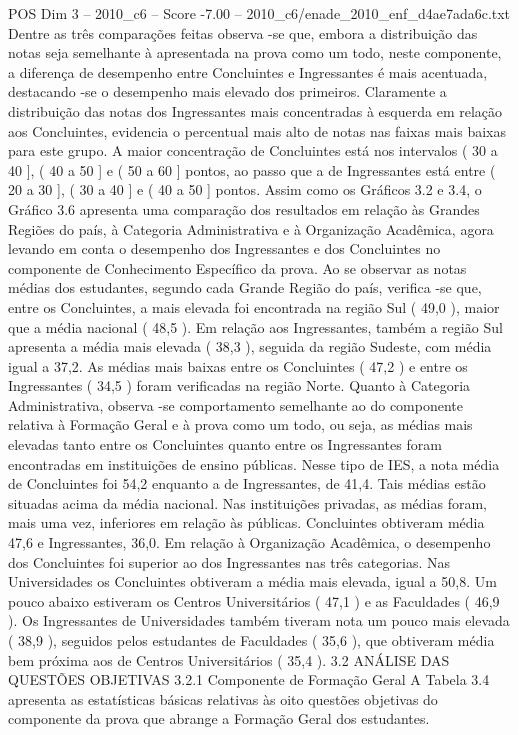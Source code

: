 \begin{textsample}{POS Dim 3 – 2010\_c6 – Score -7.00 – 2010\_c6/enade\_2010\_enf\_d4ae7ada6c.txt}
Dentre as três comparações feitas observa -se que, embora a distribuição das notas seja semelhante à apresentada na prova como um todo, neste componente, a diferença de desempenho entre Concluintes e Ingressantes é mais acentuada, destacando -se o desempenho mais elevado dos primeiros.
Claramente a distribuição das notas dos Ingressantes mais concentradas à esquerda em relação aos Concluintes, evidencia o percentual mais alto de notas nas faixas mais baixas para este grupo.
A maior concentração de Concluintes está nos intervalos ( 30 a 40 ], ( 40 a 50 ] e ( 50 a 60 ] pontos, ao passo que a de Ingressantes está entre ( 20 a 30 ], ( 30 a 40 ] e ( 40 a 50 ] pontos.
Assim como os Gráficos 3.2 e 3.4, o Gráfico 3.6 apresenta uma comparação dos resultados em relação às Grandes Regiões do país, à Categoria Administrativa e à Organização Acadêmica, agora levando em conta o desempenho dos Ingressantes e dos Concluintes no componente de Conhecimento Específico da prova.
Ao se observar as notas médias dos estudantes, segundo cada Grande Região do país, verifica -se que, entre os Concluintes, a mais elevada foi encontrada na região Sul ( 49,0 ), maior que a média nacional ( 48,5 ).
Em relação aos Ingressantes, também a região Sul apresenta a média mais elevada ( 38,3 ), seguida da região Sudeste, com média igual a 37,2.
As médias mais baixas entre os Concluintes ( 47,2 ) e entre os Ingressantes ( 34,5 ) foram verificadas na região Norte.
Quanto à Categoria Administrativa, observa -se comportamento semelhante ao do componente relativa à Formação Geral e à prova como um todo, ou seja, as médias mais elevadas tanto entre os Concluintes quanto entre os Ingressantes foram encontradas em instituições de ensino públicas.
Nesse tipo de IES, a nota média de Concluintes foi 54,2 enquanto a de Ingressantes, de 41,4.
Tais médias estão situadas acima da média nacional.
Nas instituições privadas, as médias foram, mais uma vez, inferiores em relação às públicas.
Concluintes obtiveram média 47,6 e Ingressantes, 36,0.
Em relação à Organização Acadêmica, o desempenho dos Concluintes foi superior ao dos Ingressantes nas três categorias.
Nas Universidades os Concluintes obtiveram a média mais elevada, igual a 50,8.
Um pouco abaixo estiveram os Centros Universitários ( 47,1 ) e as Faculdades ( 46,9 ).
Os Ingressantes de Universidades também tiveram nota um pouco mais elevada ( 38,9 ), seguidos pelos estudantes de Faculdades ( 35,6 ), que obtiveram média bem próxima aos de Centros Universitários ( 35,4 ). 3.2 ANÁLISE DAS QUESTÕES OBJETIVAS 3.2.1 Componente de Formação Geral A Tabela 3.4 apresenta as estatísticas básicas relativas às oito questões objetivas do componente da prova que abrange a Formação Geral dos estudantes.

\end{textsample}
